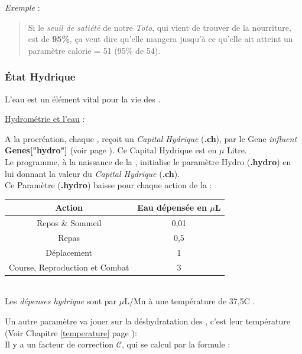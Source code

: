 \documentclass[french]{report}
\begin{document}
\textit{Exemple} :
\begin{quote}
	Si le \textit{seuil de satiété} de notre \CoCiX \emph{Toto}, qui vient de trouver de la nourriture, est de \textbf{95\%}, ça veut dire qu'elle mangera jusqu'à ce qu'elle ait atteint un paramètre calorie = 51 (95\% de 54).\\
\end{quote}

\subsubsection{État Hydrique}\label{hydro}
L'eau est un élément vital pour la vie des \CoCiX.

\begin{center}
	\underline{Hydrométrie et l'eau} :
\end{center}
A la procréation, chaque \CoCiX, reçoit un \textit{Capital Hydrique} (\textbf{.ch}), par le Gene \textit{influent} \textbf{Genes["hydro"]} (voir page \pageref{liste_gene}). Ce Capital Hydrique est en $\mu$ Litre.\\

Le programme, à la naissance de la \CoCiX, initialise le paramètre Hydro (\textbf{.hydro}) en lui donnant la valeur du \textit{Capital Hydrique} (\textbf{.ch}).\\
Ce Paramètre (\textbf{.hydro}) baisse pour chaque action de la \CoCiX  :\\
\begin{center}
	\begin{tabular}{|c|c|}\hline
		\rowcolor{yellow}\textbf{Action} & \textbf{Eau dépensée en $\mu$L}\\ \hline
		Repos \& Sommeil  & 0,01 \\ \hline
		Repas & 0,5 \\ \hline
		Déplacement & 1 \\ \hline
		Course, Reproduction et Combat & 3\\ \hline
	\end{tabular}\\
	Les \textit{dépenses hydrique} sont par $\mu$L/Mn à une température de 37,5\degres C .
\end{center}

Un autre paramètre va jouer sur la déshydratation des \CoCiX, c'est leur température (Voir Chapitre \ref{temperature} page \pageref{temperature}):\\
Il y a un facteur de correction $\mathcal{C}$, qui se calcul par la formule :
\end{document}
